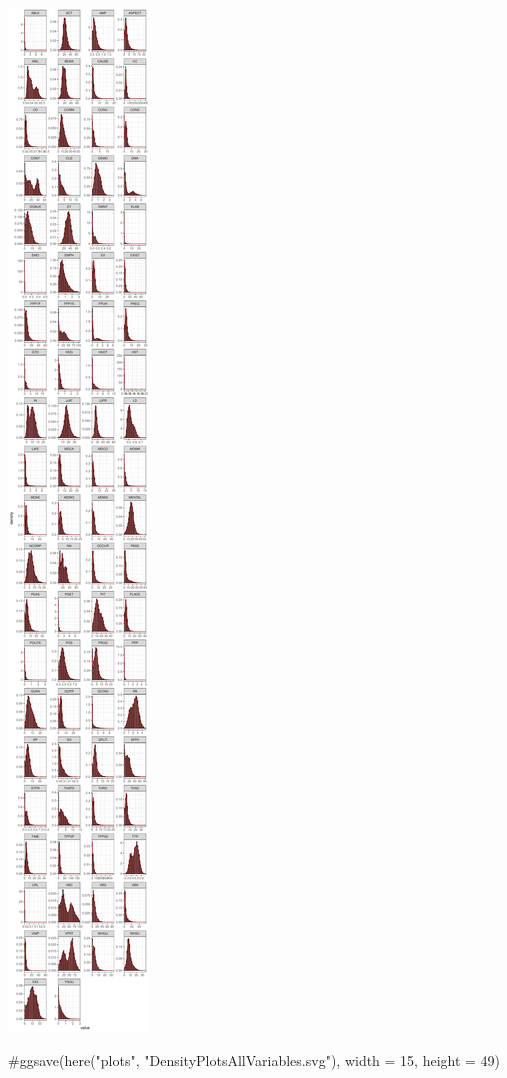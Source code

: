 \documentclass[
  letterpaper,
  DIV=11,
  numbers=noendperiod]{scrreprt}
\newenvironment{Shaded}{\begin{snugshade}}{\end{snugshade}}
\newcommand{\CommentTok}[1]{\textcolor[rgb]{0.37,0.37,0.37}{#1}}
\begin{document}
\includegraphics{F_Ch7_DataPrep_files/figure-pdf/distribution-viz-1.pdf}

\begin{Shaded}
\begin{Highlighting}[]
\CommentTok{\#ggsave(here("plots", "DensityPlotsAllVariables.svg"), width = 15, height = 49)}
\end{Highlighting}
\end{Shaded}
\end{document}
